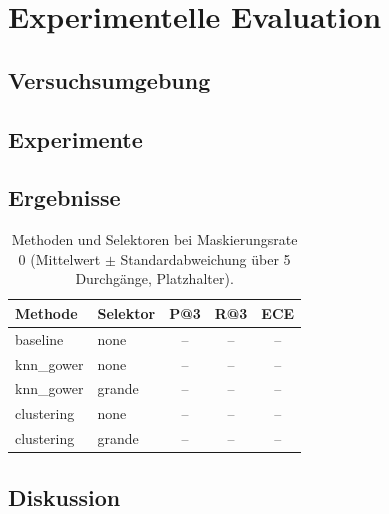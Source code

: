 \chapter{Experimentelle Evaluation}
\label{cha:evaluation}

\section{Versuchsumgebung}
\label{sec:setting}

\section{Experimente}
\label{sec:experimente}

\section{Ergebnisse}
\label{sec:ergebnisse}
\begin{table}[htbp]
  \centering
  \caption[Vergleich der Methoden]{Methoden und Selektoren bei Maskierungsrate 0
    (Mittelwert $\pm$ Standardabweichung über 5 Durchgänge, Platzhalter).}
  \label{tab:ergebnisse}
  \begin{tabular}{llccc}
    \toprule
    Methode & Selektor & P@3 & R@3 & ECE \\
    \midrule
    baseline   & none   & -- & -- & -- \\
    knn\_gower & none   & -- & -- & -- \\
    knn\_gower & grande & -- & -- & -- \\
    clustering & none   & -- & -- & -- \\
    clustering & grande & -- & -- & -- \\
    \bottomrule
  \end{tabular}
\end{table}

\section{Diskussion}
\label{sec:diskussion}
